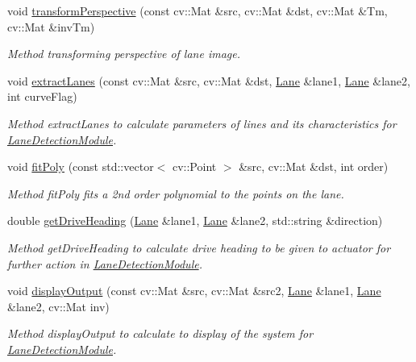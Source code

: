 \begin{DoxyCompactItemize}
void \hyperlink{classLaneDetectionModule_a3b8c0ca214fbf200c25bd24194140afc}{transform\+Perspective} (const cv\+::\+Mat \&src, cv\+::\+Mat \&dst, cv\+::\+Mat \&Tm, cv\+::\+Mat \&inv\+Tm)
\begin{DoxyCompactList}\small\item\em Method transforming perspective of lane image. \end{DoxyCompactList}\item 
void \hyperlink{classLaneDetectionModule_aac3d46f14bbdbdea78991e84beff383e}{extract\+Lanes} (const cv\+::\+Mat \&src, cv\+::\+Mat \&dst, \hyperlink{classLane}{Lane} \&lane1, \hyperlink{classLane}{Lane} \&lane2, int curve\+Flag)
\begin{DoxyCompactList}\small\item\em Method extract\+Lanes to calculate parameters of lines and its characteristics for \hyperlink{classLaneDetectionModule}{Lane\+Detection\+Module}. \end{DoxyCompactList}\item 
void \hyperlink{classLaneDetectionModule_a9b982428acc3a1e83503c6e079ae3a50}{fit\+Poly} (const std\+::vector$<$ cv\+::\+Point $>$ \&src, cv\+::\+Mat \&dst, int order)
\begin{DoxyCompactList}\small\item\em Method fit\+Poly fits a 2nd order polynomial to the points on the lane. \end{DoxyCompactList}\item 
double \hyperlink{classLaneDetectionModule_a5a3cfd88512d1ce1e5dc55aed8d47e5f}{get\+Drive\+Heading} (\hyperlink{classLane}{Lane} \&lane1, \hyperlink{classLane}{Lane} \&lane2, std\+::string \&direction)
\begin{DoxyCompactList}\small\item\em Method get\+Drive\+Heading to calculate drive heading to be given to actuator for further action in \hyperlink{classLaneDetectionModule}{Lane\+Detection\+Module}. \end{DoxyCompactList}\item 
void \hyperlink{classLaneDetectionModule_a486a1a228a0b9a2556ff3f102da7d938}{display\+Output} (const cv\+::\+Mat \&src, cv\+::\+Mat \&src2, \hyperlink{classLane}{Lane} \&lane1, \hyperlink{classLane}{Lane} \&lane2, cv\+::\+Mat inv)
\begin{DoxyCompactList}\small\item\em Method display\+Output to calculate to display of the system for \hyperlink{classLaneDetectionModule}{Lane\+Detection\+Module}. \end{DoxyCompactList}\item 

\end{DoxyCompactItemize}
